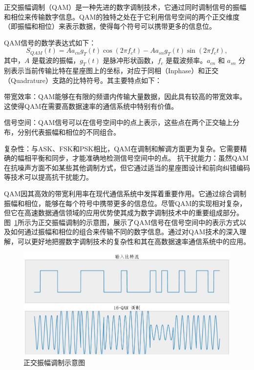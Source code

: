 正交振幅调制（QAM）是一种先进的数字调制技术，它通过同时调制信号的振幅和相位来传输数字信息。QAM的独特之处在于它利用信号空间的两个正交维度（即振幅和相位）来表示数据，使得每个符号可以携带更多的信息位。

QAM信号的数学表达式如下：
\begin{equation}
    S_{QAM}(t) = Aa_{cn}g_T(t)\cos(2\pi f_c t) - Aa_{sn}g_T(t)\sin(2\pi f_c t),
\end{equation}
其中，\( A \) 是载波的振幅，\( g_T(t) \) 是脉冲形状函数，\( f_c \) 是载波频率。\( a_{cn} \) 和 \( a_{sn} \) 分别表示当前传输比特在星座图上的坐标，对应于同相（Inphase）和正交（Quadrature）支路的比特符号。其主要特点如下：

带宽效率：QAM能够在有限的频谱内传输大量数据，因此具有较高的带宽效率。这使得QAM在需要高数据速率的通信系统中特别有价值。

信号空间：QAM信号可以在信号空间中的点上表示，这些点在两个正交轴上分布，分别代表振幅和相位的不同组合。

复杂性：与ASK、FSK和PSK相比，QAM在调制和解调方面更为复杂。它需要精确的幅相平衡和同步，才能准确地检测信号空间中的点。
抗干扰能力：虽然QAM在抗噪声方面不如某些其他调制方式，但它通过适当的星座图设计和前向纠错编码等技术可以提高抗干扰能力。

QAM因其高效的带宽利用率在现代通信系统中发挥着重要作用。它通过综合调制振幅和相位，能够在每个符号中携带更多的信息位。尽管QAM的实现相对复杂，但它在高速数据通信领域的应用优势使其成为数字调制技术中的重要组成部分。图~\ref{fig:QAM}所示为正交振幅调制的示意图，展示了QAM信号在信号空间中的表示方式以及如何通过振幅和相位的组合来传输不同的数字信息。通过对QAM技术的深入理解，可以更好地把握数字调制技术的复杂性和其在高数据速率通信系统中的应用。

\begin{figure}
    \centering
    \includegraphics[width=\textwidth]{Image/qam.pdf}
    \caption{正交振幅调制示意图}
    \label{fig:QAM}
\end{figure}

